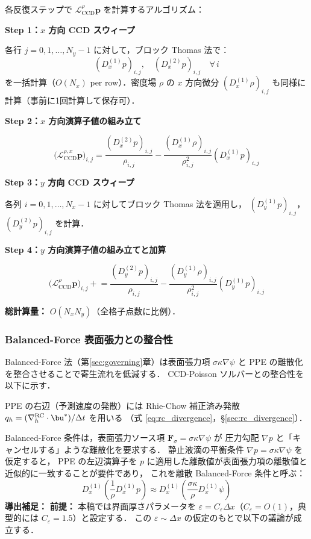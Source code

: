 \begin{tcolorbox}[defbox, title={2次元 CCD-Poisson 演算子の Matrix-Free 評価手順}]
各反復ステップで $\mathcal{L}_{\mathrm{CCD}}^{\rho}\bm{p}$ を計算するアルゴリズム：

\medskip
\textbf{Step 1：$x$ 方向 CCD スウィープ}

各行 $j = 0, 1, \dots, N_y-1$ に対して，ブロック Thomas 法で：
\[
  (D_x^{(1)} p)_{i,j},\quad (D_x^{(2)} p)_{i,j} \quad \forall\, i
\]
を一括計算（$O(N_x)$ per row）．密度場 $\rho$ の $x$ 方向微分
$(D_x^{(1)}\rho)_{i,j}$ も同様に計算（事前に1回計算して保存可）．

\medskip
\textbf{Step 2：$x$ 方向演算子値の組み立て}

\[
  \bigl(\mathcal{L}_{\mathrm{CCD}}^{\rho,x}\bm{p}\bigr)_{i,j}
  = \frac{(D_x^{(2)} p)_{i,j}}{\rho_{i,j}}
  - \frac{(D_x^{(1)}\rho)_{i,j}}{\rho_{i,j}^2}(D_x^{(1)} p)_{i,j}
\]

\medskip
\textbf{Step 3：$y$ 方向 CCD スウィープ}

各列 $i = 0, 1, \dots, N_x-1$ に対してブロック Thomas 法を適用し，
$(D_y^{(1)} p)_{i,j}$，$(D_y^{(2)} p)_{i,j}$ を計算．

\medskip
\textbf{Step 4：$y$ 方向演算子値の組み立てと加算}

\[
  \bigl(\mathcal{L}_{\mathrm{CCD}}^{\rho}\bm{p}\bigr)_{i,j}
  \mathrel{+}=
  \frac{(D_y^{(2)} p)_{i,j}}{\rho_{i,j}}
  - \frac{(D_y^{(1)}\rho)_{i,j}}{\rho_{i,j}^2}(D_y^{(1)} p)_{i,j}
\]

\medskip
\textbf{総計算量：} $O(N_x N_y)$（全格子点数に比例）．
\end{tcolorbox}

\subsubsection{Balanced-Force 表面張力との整合性}
\label{sec:ccd_balanced_force}

Balanced-Force 法（第\ref{sec:governing}章）は表面張力項
$\sigma\kappa\nabla\psi$ と PPE の離散化を整合させることで寄生流れを低減する．
CCD-Poisson ソルバーとの整合性を以下に示す．

PPE の右辺（予測速度の発散）には Rhie-Chow 補正済み発散
$q_h = (\nabla_h^{\mathrm{RC}}\cdot\bu^*)/\Delta t$ を用いる
（式 \eqref{eq:rc_divergence}，§\ref{sec:rc_divergence}）．

Balanced-Force 条件は，表面張力ソース項 $\bm{F}_\sigma = \sigma\kappa\nabla\psi$ が
圧力勾配 $\nabla p$ と「キャンセルする」ような離散化を要求する．
静止液滴の平衡条件 $\nabla p = \sigma\kappa\nabla\psi$ を仮定すると，
PPE の左辺演算子を $p$ に適用した離散値が表面張力項の離散値と近似的に一致することが要件であり，
これを離散 Balanced-Force 条件と呼ぶ：
\begin{equation}
  D_x^{(1)}\!\left(\frac{1}{\rho} D_x^{(1)} p\right) \approx
  D_x^{(1)}\!\left(\frac{\sigma\kappa}{\rho} D_x^{(1)}\psi\right)
  \label{eq:balanced_force_condition}
\end{equation}
\noindent\textbf{導出補足：}
\textbf{前提：} 本稿では界面厚さパラメータを $\varepsilon = C_\varepsilon \Delta x$（$C_\varepsilon = O(1)$，典型的には $C_\varepsilon = 1.5$）と設定する．
この $\varepsilon \sim \Delta x$ の仮定のもとで以下の議論が成立する．

